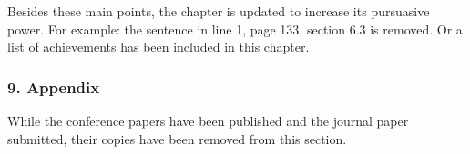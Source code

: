 Besides these main points, the chapter is updated to increase its pursuasive power.
For example: the sentence in line 1, page 133, section 6.3 is removed.
Or a list of achievements has been included in this chapter.

\subsubsection*{9. Appendix}

While the conference papers have been published and the journal paper submitted,
  their copies have been removed from this section.



